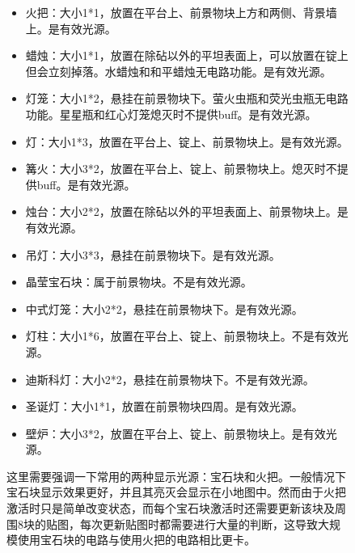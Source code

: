 \begin{figure}[!ht]
\begin{itemize}
\item 火把：大小1*1，放置在平台上、前景物块上方和两侧、背景墙上。是有效光源。
\item 蜡烛：大小1*1，放置在除砧以外的平坦表面上，可以放置在锭上但会立刻掉落。水蜡烛和和平蜡烛无电路功能。是有效光源。
\item 灯笼：大小1*2，悬挂在前景物块下。萤火虫瓶和荧光虫瓶无电路功能。星星瓶和红心灯笼熄灭时不提供buff。是有效光源。
\item 灯：大小1*3，放置在平台上、锭上、前景物块上。是有效光源。
\item 篝火：大小3*2，放置在平台上、锭上、前景物块上。熄灭时不提供buff。是有效光源。
\item 烛台：大小2*2，放置在除砧以外的平坦表面上、前景物块上。是有效光源。
\item 吊灯：大小3*3，悬挂在前景物块下。是有效光源。
\item 晶莹宝石块：属于前景物块。不是有效光源。
\item 中式灯笼：大小2*2，悬挂在前景物块下。是有效光源。
\item 灯柱：大小1*6，放置在平台上、锭上、前景物块上。不是有效光源。
\item 迪斯科灯：大小2*2，悬挂在前景物块下。不是有效光源。
\item 圣诞灯：大小1*1，放置在前景物块四周。是有效光源。
\item 壁炉：大小3*2，放置在平台上、锭上、前景物块上。是有效光源。
\end{itemize}

这里需要强调一下常用的两种显示光源：宝石块和火把。一般情况下宝石块显示效果更好，并且其亮灭会显示在小地图中。然而由于火把激活时只是简单改变状态，而每个宝石块激活时还需要更新该块及周围8块的贴图，每次更新贴图时都需要进行大量的判断，这导致大规模使用宝石块的电路与使用火把的电路相比更卡。


\end{figure}
